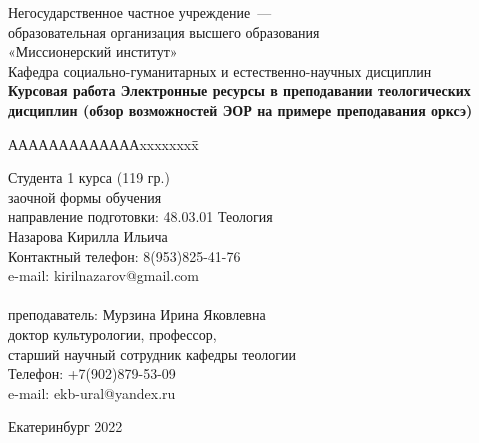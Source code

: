 \begin{titlepage}
\large
\begin{center}
Негосударственное частное учреждение~---\\образовательная организация высшего образования\\«Миссионерский институт»\\
Кафедра социально-гуманитарных и естественно-научных дисциплин
\\ 
\vspace{6em}
\textbf{Курсовая работа 
\linebreak Электронные ресурсы в преподавании теологических дисциплин \linebreak (обзор возможностей ЭОР на примере преподавания орксэ)}

\end{center}
\vspace{6em}
\newbox{\lbox}


\begin{tabbing}
АААААААААААААxxxxxxxx\=\hspace{9ex}\=
\kill

\> Студента 1 курса (119 гр.) \\
\> заочной формы обучения \\
\> направление подготовки: 48.03.01 Теология \\
\> Назарова Кирилла Ильича \\
\> Контактный телефон: 8(953)825-41-76 \\
\> e-mail: kirilnazarov@gmail.com \\
\\
\> преподаватель: Мурзина Ирина Яковлевна \\
\> доктор культурологии, профессор, \\
\> старший научный сотрудник кафедры теологии \\
\> Телефон: +7(902)879-53-09 \\
\> e-mail: ekb-ural@yandex.ru
\end{tabbing}


\vspace{\fill}
\begin{center}
Екатеринбург 2022
\end{center}
\end{titlepage}